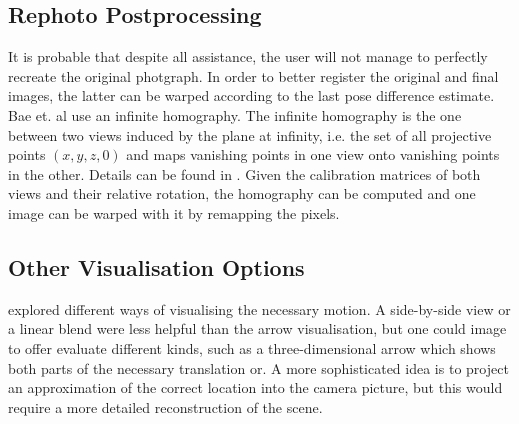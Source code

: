 \subsection{Rephoto Postprocessing}

It is probable that despite all assistance, the user will not manage to
perfectly recreate the original photgraph.  In order to better register the
original and final images, the latter can be warped according to the last pose
difference estimate. Bae et. al use an infinite homography. The infinite
homography is the one between two views induced by the plane at infinity, i.e.
the set of all projective points $(x,y,z,0)$ and maps vanishing points in one
view onto vanishing points in the other. Details can be found in \citep[ch. 13.4]{h&z2004}.
Given the calibration matrices of both views and their relative
rotation, the homography can be computed and one image can be warped with it
by remapping the pixels.

\subsection{Other Visualisation Options}\label{subsec:alternative_visualisation}

\citet{bae2010} explored different ways of visualising the necessary motion.
A side-by-side view or a linear blend were less helpful than the arrow
visualisation, but one could image to offer evaluate different kinds, such as
a three-dimensional arrow which shows both parts of the necessary translation
or. A more sophisticated idea is to project an approximation of the correct
location into the camera picture, but this would require a more detailed
reconstruction of the scene.

